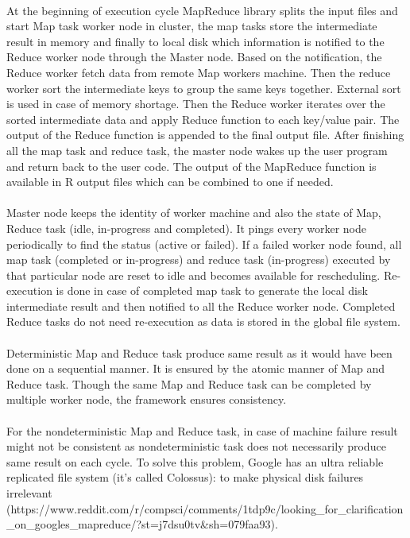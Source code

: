 \documentclass{article}
\begin{document}
\paragraph{}
At the beginning of execution cycle MapReduce library splits the input files and start Map task worker node in cluster, the map tasks store the intermediate result in memory and finally to local disk  which information is notified to the Reduce worker node through the Master node. Based on the notification, the Reduce worker fetch data from remote Map workers machine. Then the reduce worker sort the intermediate keys to group the same keys together. External sort is used in case of memory shortage. Then the Reduce worker iterates over the sorted intermediate data and apply Reduce function to each key/value pair. The output of the Reduce function is appended to the final output file. After finishing all the map task and reduce task, the master node wakes up the user program and return back to the user code. The output of the MapReduce function is available in R output files which can be combined to one if needed.

\paragraph{}
Master node keeps the identity of worker machine and also the state of Map, Reduce task (idle, in-progress and completed). It pings every worker node periodically to find the status (active or failed). If a failed worker node found, all map task (completed or in-progress) and reduce task (in-progress) executed by that particular node are reset to idle and becomes available for rescheduling. Re-execution is done in case of completed map task to generate the local disk intermediate result and then notified to all the Reduce worker node. Completed Reduce tasks do not need re-execution as data is stored in the global file system.

\paragraph{}
Deterministic Map and Reduce task produce same result as it would have been done on a sequential manner. It is ensured by the atomic manner of Map and Reduce task. Though the same Map and Reduce task can be completed by multiple worker node, the framework ensures consistency.

\paragraph{}
For the nondeterministic Map and Reduce task, in case of machine failure result might not be consistent as nondeterministic task does not necessarily produce same result on each cycle. To solve this problem, Google has an ultra reliable replicated file system (it's called Colossus): to make physical disk failures irrelevant (https://www.reddit.com/r/compsci/comments/1tdp9c/looking_for_clarification_on_googles_mapreduce/?st=j7dsu0tv&sh=079faa93).
\end{document}
